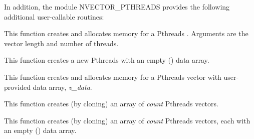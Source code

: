 \documentclass[letterpaper,10pt,english]{sphinxmanual}
\begin{document}
In addition, the module NVECTOR\_PTHREADS provides the following
additional user-callable routines:

\begin{fulllineitems}
\label{nvectors/NVector_Pthreads:N_VNew_Pthreads}
This function creates and allocates memory for a Pthreads
. Arguments are the vector length and number of threads.

\end{fulllineitems}


\begin{fulllineitems}
\label{nvectors/NVector_Pthreads:N_VNewEmpty_Pthreads}
This function creates a new Pthreads  with an empty
() data array.

\end{fulllineitems}


\begin{fulllineitems}
\label{nvectors/NVector_Pthreads:N_VMake_Pthreads}
This function creates and allocates memory for a Pthreads vector with
user-provided data array, \emph{v\_data}.

\end{fulllineitems}


\begin{fulllineitems}
\label{nvectors/NVector_Pthreads:N_VCloneVectorArray_Pthreads}
This function creates (by cloning) an array of \emph{count} Pthreads
vectors.

\end{fulllineitems}


\begin{fulllineitems}
\label{nvectors/NVector_Pthreads:N_VCloneEmptyVectorArray_Pthreads}
This function creates (by cloning) an array of \emph{count} Pthreads
vectors, each with an empty () data array.

\end{fulllineitems}
\end{document}
